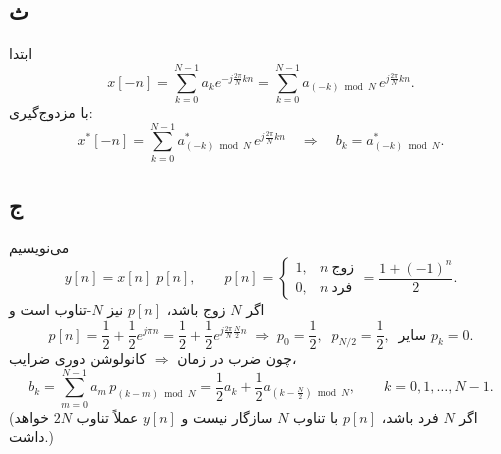 \subsection*{ث}
ابتدا
\[
x[-n]=\sum_{k=0}^{N-1} a_k e^{-j\frac{2\pi}{N}kn}
=\sum_{k=0}^{N-1} a_{(-k)\bmod N}\, e^{j\frac{2\pi}{N}kn}.
\]
با مزدوج‌گیری:
\[
x^{*}[-n]=\sum_{k=0}^{N-1} a_{(-k)\bmod N}^{*}\, e^{j\frac{2\pi}{N}kn}
\quad\Longrightarrow\quad
b_k=a_{(-k)\bmod N}^{*}.
\]

\subsection*{ج}
می‌نویسیم
\[
y[n]=x[n]\;p[n],
\qquad
p[n]=
\begin{cases}
1,& n \ \text{زوج}\\
0,& n \ \text{فرد}
\end{cases}
=\frac{1+(-1)^n}{2}.
\]
اگر $N$ زوج باشد، $p[n]$ نیز $N$-تناوب است و
\[
p[n]=\frac{1}{2}+\frac{1}{2}e^{j\pi n}
=\frac{1}{2}+\frac{1}{2}e^{j\frac{2\pi}{N}\frac{N}{2}n}
\;\Longrightarrow\;
p_0=\frac12,\;\; p_{N/2}=\frac12,\;\; \text{سایر } p_k=0.
\]
چون ضرب در زمان $\Rightarrow$ کانولوشن دوری ضرایب،
\[
b_k=\sum_{m=0}^{N-1} a_m\, p_{(k-m)\bmod N}
=\frac12 a_k+\frac12 a_{(k-\frac{N}{2})\bmod N},
\qquad k=0,1,\dots,N-1.
\]
(اگر $N$ فرد باشد، $p[n]$ با تناوب $N$ سازگار نیست و $y[n]$ عملاً تناوب $2N$ خواهد داشت.)